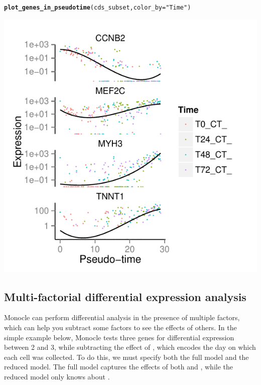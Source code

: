 \documentclass[10pt,oneside]{article}\usepackage[]{graphicx}\usepackage[]{color}
\makeatletter
\def\maxwidth{ %
  \ifdim\Gin@nat@width>\linewidth
    \linewidth
  \else
    \Gin@nat@width
  \fi
}
\newcommand{\hlstr}[1]{\textcolor[rgb]{0.192,0.494,0.8}{#1}}%
\newcommand{\hlstd}[1]{\textcolor[rgb]{0.345,0.345,0.345}{#1}}%
\newcommand{\hlkwc}[1]{\textcolor[rgb]{0.333,0.667,0.333}{#1}}%
\newcommand{\hlkwd}[1]{\textcolor[rgb]{0.737,0.353,0.396}{\textbf{#1}}}%
\newenvironment{kframe}{%
 \def\at@end@of@kframe{}%
 \ifinner\ifhmode%
  \def\at@end@of@kframe{\end{minipage}}%
  \begin{minipage}{\columnwidth}%
 \fi\fi%
 \def\FrameCommand##1{\hskip\@totalleftmargin \hskip-\fboxsep
 \colorbox{shadecolor}{##1}\hskip-\fboxsep
     \hskip-\linewidth \hskip-\@totalleftmargin \hskip\columnwidth}%
 \MakeFramed {\advance\hsize-\width
   \@totalleftmargin\z@ \linewidth\hsize
   \@setminipage}}%
 {\par\unskip\endMakeFramed%
 \at@end@of@kframe}
\newenvironment{knitrout}{}{} %
\makeatother
\begin{document}
\begin{knitrout}
\color{fgcolor}\begin{kframe}
\begin{alltt}
\hlkwd{plot_genes_in_pseudotime}\hlstd{(cds_subset,} \hlkwc{color_by} \hlstd{=} \hlstr{"Time"}\hlstd{)}
\end{alltt}
\end{kframe}

{\centering \includegraphics[width=\maxwidth]{figure/plot_diff_res_pt} 

}



\end{knitrout}


\subsection{Multi-factorial differential expression analysis}

Monocle can perform differential analysis in the presence of multiple factors, which can help you subtract some factors to see the effects of others.  In the simple example below, Monocle tests three genes for differential expression between  2 and 3, while subtracting the effect of , which encodes the day on which each cell was collected. To do this, we must specify both the full model and the reduced model. The full model captures the effects of both  and , while the reduced model only knows about .  
\end{document}
